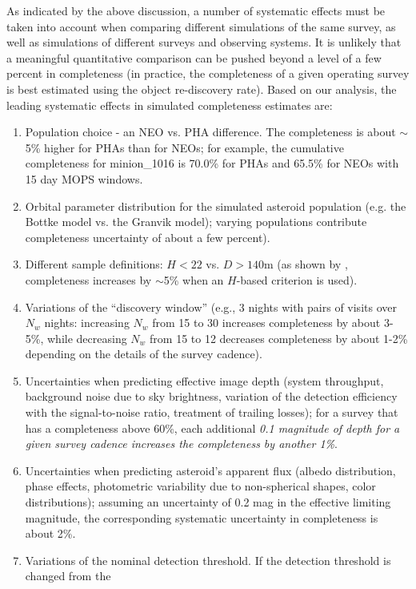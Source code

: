 As indicated by the above discussion, a number of systematic effects must be taken into account when
comparing different simulations of the same survey, as well as simulations of different surveys and observing
systems. It is unlikely that a meaningful quantitative comparison can be pushed beyond a level of a few percent
in completeness (in practice, the completeness of a given operating survey is best estimated using the object
re-discovery rate). Based on our analysis, the leading systematic effects in simulated completeness estimates are:
\begin{enumerate}
\item Population choice - an NEO vs. PHA difference. The completeness is about $\sim$5\% higher for PHAs than for NEOs; for example,
the cumulative completeness for minion\_1016 is 70.0\% for PHAs and 65.5\% for NEOs with 15 day MOPS windows.
\item Orbital parameter distribution for the simulated asteroid population (e.g. the Bottke model
             vs. the Granvik model); varying populations contribute completeness uncertainty of about a few percent).
\item Different sample definitions: $H<22$ vs. $D>140$m (as shown by \citealt{GMS2016}, completeness
           increases by $\sim$5\% when an $H$-based criterion is used).
\item Variations of the ``discovery window'' (e.g., 3 nights with pairs of visits over $N_w$ nights: increasing
        $N_w$ from 15 to 30 increases completeness by about 3-5\%, while decreasing $N_w$ from 15 to 12 decreases 
        completeness by about 1-2\% depending on the details of the survey cadence).
\item Uncertainties when predicting effective image depth (system throughput, background noise due to sky brightness, 
          variation of the detection efficiency with the signal-to-noise ratio, treatment of trailing losses); for a survey that has a 
          completeness above 60\%, each additional {\it 0.1 magnitude of depth for a given survey cadence increases the 
          completeness by another 1\%}.
\item Uncertainties when predicting asteroid's apparent flux (albedo distribution, phase effects, photometric variability
          due to non-spherical shapes, color distributions); assuming an uncertainty of 0.2 mag in the effective
          limiting magnitude, the corresponding  systematic uncertainty in completeness is about 2\%.
\item Variations of the nominal detection threshold. If the detection threshold is changed from the

\end{enumerate}
